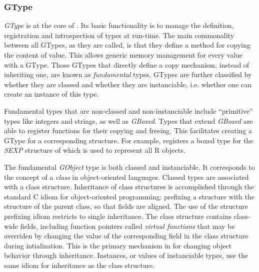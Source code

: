\documentclass[article]{jss}
\begin{document}
\subsubsection{GType}
%



\emph{GType} is at the core of . Its basic functionality
is to manage the definition, registration and introspection of types
at run-time. The main commonality between all GTypes, as they are
called, is that they define a method for copying the content of  value. This allows generic memory management for every value with a
GType. Those GTypes that directly define a copy mechanism, instead of
inheriting one, are known as \emph{fundamental} types.  GTypes are
further classified by whether they are classed and whether they are
instanciable, i.e. whether one can create an instance of this type.

Fundamental types that are non-classed and non-instanciable 
include ``primitive'' types like integers and strings, as well as
\emph{GBoxed}.
Types that extend \emph{GBoxed} are able to register functions for
their
copying and freeing. This facilitates creating a GType for a
corresponding
 structure. For example,  registers a boxed
type for 
the \emph{SEXP} structure of  which is used to represent
all R objects. 

The fundamental \emph{GObject} type is both classed and instanciable. It corresponds to the concept of a \emph{class} in object-oriented languages. Classed types are associated with a class structure. Inheritance of class structures is accomplished through the standard C idiom for object-oriented programming: prefixing a structure with the structure of the parent class, so that fields are aligned. The use of the structure prefixing idiom restricts  to single inheritance. The class structure contains class-wide fields, including function pointers called \emph{virtual functions} that may be overriden by changing the value of the corresponding field in the class structure during intialization. This is the primary mechanism in  for changing object behavior through inheritance. Instances, or values of instanciable types, use the same idiom for inheritance as the class structure.
\end{document}
